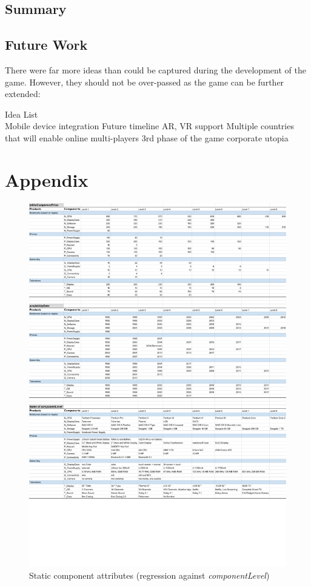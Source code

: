 \documentclass[11pt,titlepage,oneside,openany]{book}
\begin{document}
\section{Summary}

\section{Future Work}
\label{sec:future}
There were far more ideas than could be captured during the development of the game. However, they should not be over-passed as the game can be further extended: 


Idea List\\

Mobile device integration
Future timeline
AR, VR support
Multiple countries that will enable online multi-players
3rd phase of the game corporate utopia


\pagebreak
\appendix

\chapter{Appendix}
\label{cha:appendix}

\begin{figure}
    \centering
    \includegraphics[trim=0cm 5cm 0cm 0cm, scale = 0.75]{images/staticComponentAttributes.pdf}
    \caption{Static component attributes (regression against \textit{componentLevel})}
    \label{fig:staticComponentAttributes}
\end{figure}


\newpage


\pagestyle{empty}
\end{document}
